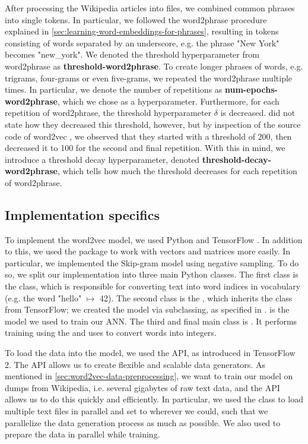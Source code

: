 After processing the Wikipedia articles into files, we combined common phrases into single tokens. In particular, we followed the word2phrase procedure explained in \cref{sec:learning-word-embeddings-for-phrases}, resulting in tokens consisting of words separated by an underscore, e.g. the phrase "New York" becomes "new\_york". We denoted the threshold hyperparameter from word2phrase as \textbf{threshold-word2phrase}. To create longer phrases of words, e.g. trigrams, four-grams or even five-grams, we repeated the word2phrase multiple times. In particular, we denote the number of repetitions as \textbf{num-epochs-word2phrase}, which we chose as a hyperparameter. Furthermore, for each repetition of word2phrase, the threshold hyperparameter $\delta$ is decreased. \cite{mikolov2013b} did not state how they decreased this threshold, however, but by inspection of the source code of word2vec \cite{Word2vecDemoPhrasesCode}, we observed that they started with a threshold of 200, then decreased it to 100 for the second and final repetition. With this in mind, we introduce a threshold decay hyperparameter, denoted \textbf{threshold-decay-word2phrase}, which tells how much the threshold decreases for each repetition of word2phrase.

\subsection{Implementation specifics}
\label{sec:word2vec-impl-specifics}
To implement the word2vec model, we used Python and TensorFlow \cite{tensorflow2015-whitepaper}. In addition to this, we used the  \cite{2020NumPy-Array} package to work with vectors and matrices more easily. In particular, we implemented the Skip-gram model using negative sampling. To do so, we split our implementation into three main Python classes. The first class is the  class, which is responsible for converting text into word indices in vocabulary (e.g. the word "hello" $\mapsto$ 42). The second class is the , which inherits the  class from TensorFlow; we created the model via subclassing, as specified in \cite{TensorflowSubclassing2020}.  is the model we used to train our ANN. The third and final main class is . It performs training using the  and uses  to convert words into integers.

To load the data into the model, we used the  API, as introduced in TensorFlow 2. The  API allows us to create flexible and scalable data generators. As mentioned in \cref{sec:word2vec-data-preprocessing}, we want to train our model on dumps from Wikipedia, i.e. several gigabytes of raw text data, and the  API allows us to do this quickly and efficiently. In particular, we used the  class to load multiple text files in parallel and set  to  wherever we could, such that we parallelize the data generation process as much as possible. We also used  to prepare the data in parallel while training.

